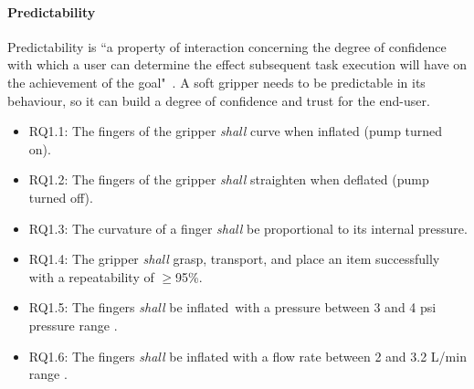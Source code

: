\documentclass[lettersize,journal]{IEEEtran}
\begin{document}
\paragraph{Predictability}\label{predictability}
Predictability is ``a property of interaction concerning the degree of confidence with which a user can determine the effect subsequent task execution will have on the achievement of the goal"~\cite{Abowd1991}. A soft gripper needs to be predictable in its behaviour, so it can build a degree of confidence and trust for the end-user.  
\begin{itemize}
	\item RQ1.1: The fingers of the gripper \emph{shall} curve when inflated (pump turned on).  
	\item RQ1.2: The fingers of the gripper \emph{shall} straighten when deflated (pump turned off).  
	\item RQ1.3: The curvature of a finger \emph{shall} be proportional to its internal pressure. 
	\item RQ1.4: The gripper \emph{shall} grasp, transport, and place an item successfully with a repeatability of $\ge$95\%.
	\item RQ1.5: The fingers \emph{shall} be inflated with a pressure between 3 and 4 psi pressure range \cite{Partridge2022}. 
	\item RQ1.6: The fingers \emph{shall} be inflated with a flow rate between 2 and 3.2 L/min range \cite{DEWIN2022}.
\end{itemize}
\end{document}
